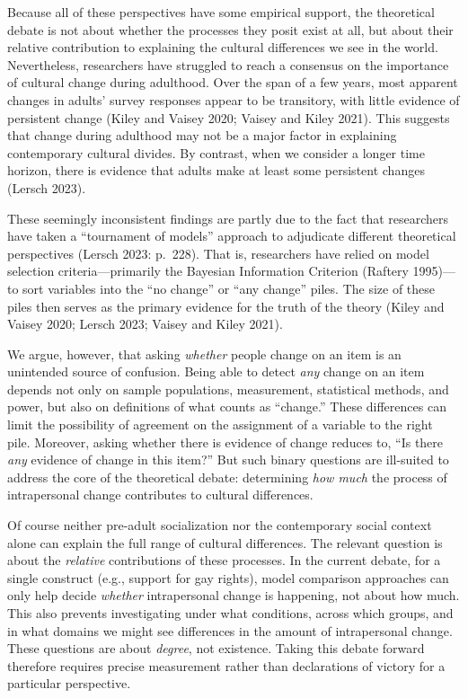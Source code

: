 \documentclass[
  12pt,
]{article}
\begin{document}
Because all of these perspectives have some empirical support, the
theoretical debate is not about whether the processes they posit exist
at all, but about their relative contribution to explaining the cultural
differences we see in the world. Nevertheless, researchers have
struggled to reach a consensus on the importance of cultural change
during adulthood. Over the span of a few years, most apparent changes in
adults' survey responses appear to be transitory, with little evidence
of persistent change (Kiley and Vaisey 2020; Vaisey and Kiley 2021).
This suggests that change during adulthood may not be a major factor in
explaining contemporary cultural divides. By contrast, when we consider
a longer time horizon, there is evidence that adults make at least some
persistent changes (Lersch 2023).

These seemingly inconsistent findings are partly due to the fact that
researchers have taken a ``tournament of models'' approach to adjudicate
different theoretical perspectives (Lersch 2023: p.~228). That is,
researchers have relied on model selection criteria---primarily the
Bayesian Information Criterion (Raftery 1995)---to sort variables into
the ``no change'' or ``any change'' piles. The size of these piles then
serves as the primary evidence for the truth of the theory (Kiley and
Vaisey 2020; Lersch 2023; Vaisey and Kiley 2021).

We argue, however, that asking \emph{whether} people change on an item
is an unintended source of confusion. Being able to detect \emph{any}
change on an item depends not only on sample populations, measurement,
statistical methods, and power, but also on definitions of what counts
as ``change.'' These differences can limit the possibility of agreement
on the assignment of a variable to the right pile. Moreover, asking
whether there is evidence of change reduces to, ``Is there \emph{any}
evidence of change in this item?'' But such binary questions are
ill-suited to address the core of the theoretical debate: determining
\emph{how much} the process of intrapersonal change contributes to
cultural differences.

Of course neither pre-adult socialization nor the contemporary social
context alone can explain the full range of cultural differences. The
relevant question is about the \emph{relative} contributions of these
processes. In the current debate, for a single construct (e.g., support
for gay rights), model comparison approaches can only help decide
\emph{whether} intrapersonal change is happening, not about how much.
This also prevents investigating under what conditions, across which
groups, and in what domains we might see differences in the amount of
intrapersonal change. These questions are about \emph{degree}, not
existence. Taking this debate forward therefore requires precise
measurement rather than declarations of victory for a particular
perspective.
\end{document}

